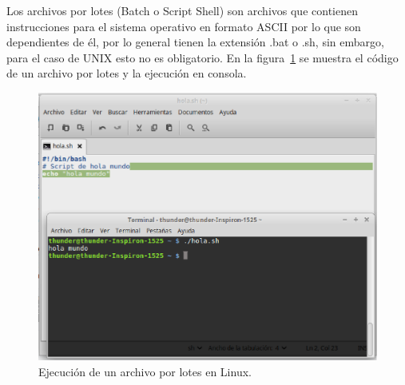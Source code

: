 

Los archivos por lotes (Batch o Script Shell) \cite{Silberschatz1999} son
 archivos que contienen instrucciones para el sistema operativo en formato
 ASCII por lo que son dependientes de \'el, por lo general tienen la extensi\'on
 .bat o .sh, sin embargo, para el caso de UNIX esto no es obligatorio. En la
 figura~\ref{fig:script} se muestra el c\'odigo de un archivo por lotes y la 
 ejecuci\'on en consola.



\begin{figure}[h]
\centering
\includegraphics[width=0.7\columnwidth]{chap2/Imagenes/Script.eps}
\caption{Ejecuci\'on de un archivo por lotes en Linux.}
\label{fig:script}
\end{figure}